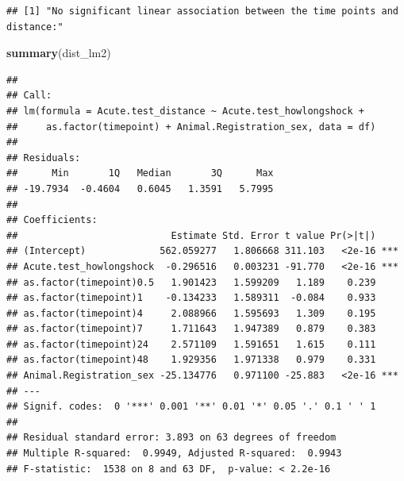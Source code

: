 \documentclass[]{article}
\newenvironment{Shaded}{\begin{snugshade}}{\end{snugshade}}
\newcommand{\KeywordTok}[1]{\textcolor[rgb]{0.13,0.29,0.53}{\textbf{#1}}}
\newcommand{\NormalTok}[1]{#1}
\begin{document}
\begin{verbatim}
## [1] "No significant linear association between the time points and distance:"
\end{verbatim}

\begin{Shaded}
\begin{Highlighting}[]
\KeywordTok{summary}\NormalTok{(dist_lm2)}
\end{Highlighting}
\end{Shaded}

\begin{verbatim}
## 
## Call:
## lm(formula = Acute.test_distance ~ Acute.test_howlongshock + 
##     as.factor(timepoint) + Animal.Registration_sex, data = df)
## 
## Residuals:
##      Min       1Q   Median       3Q      Max 
## -19.7934  -0.4604   0.6045   1.3591   5.7995 
## 
## Coefficients:
##                           Estimate Std. Error t value Pr(>|t|)    
## (Intercept)             562.059277   1.806668 311.103   <2e-16 ***
## Acute.test_howlongshock  -0.296516   0.003231 -91.770   <2e-16 ***
## as.factor(timepoint)0.5   1.901423   1.599209   1.189    0.239    
## as.factor(timepoint)1    -0.134233   1.589311  -0.084    0.933    
## as.factor(timepoint)4     2.088966   1.595693   1.309    0.195    
## as.factor(timepoint)7     1.711643   1.947389   0.879    0.383    
## as.factor(timepoint)24    2.571109   1.591651   1.615    0.111    
## as.factor(timepoint)48    1.929356   1.971338   0.979    0.331    
## Animal.Registration_sex -25.134776   0.971100 -25.883   <2e-16 ***
## ---
## Signif. codes:  0 '***' 0.001 '**' 0.01 '*' 0.05 '.' 0.1 ' ' 1
## 
## Residual standard error: 3.893 on 63 degrees of freedom
## Multiple R-squared:  0.9949, Adjusted R-squared:  0.9943 
## F-statistic:  1538 on 8 and 63 DF,  p-value: < 2.2e-16
\end{verbatim}
\end{document}
